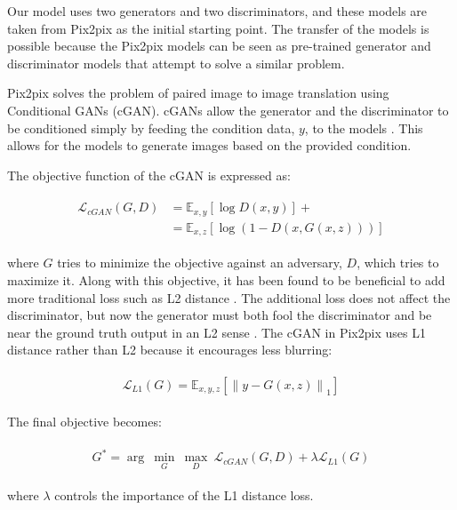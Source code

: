 \documentclass[conference]{IEEEtran}
\begin{document}
Our model uses two generators and two discriminators, and these models are taken from Pix2pix as the initial starting point. The transfer of the models is possible because the Pix2pix models can be seen as pre-trained generator and discriminator models that attempt to solve a similar problem. 

Pix2pix solves the problem of paired image to image translation using Conditional GANs (cGAN). cGANs allow the generator and the discriminator to be conditioned simply by feeding the condition data, $y$, to the models \cite{mirza_conditional_2014}. This allows for the models to generate images based on the provided condition.

The objective function of the cGAN is expressed as:

\begin{align}
    \begin{split}
        \mathcal{L}_{cGAN}(G,D) &= \mathbb{E}_{x,y}[\log D(x,y)] + \\
        &= \mathbb{E}_{x,z}[\log(1-D(x,G(x,z)))]
    \end{split}
\end{align}

where $G$ tries to minimize the objective against an adversary, $D$, which tries to maximize it. Along with this objective, it has been found to be beneficial to add more traditional loss such as L2 distance \cite{pathak_context_2016}. The additional loss does not affect the discriminator, but now the generator must both fool the discriminator and be near the ground truth output in an L2 sense \cite{isola_image--image_2018}. The cGAN in Pix2pix uses L1 distance rather than L2 because it encourages less blurring:

\begin{align}
    \begin{split}
        \mathcal{L}_{L1}(G)=\mathbb{E}_{x,y,z}[{\lVert y - G(x,z) \rVert}_1]
    \end{split}
\end{align}

The final objective becomes:

\begin{align}
    \begin{split}
        G^* = {\arg}\:\underset{G}{\min}\:\underset{D}{\max}\:\mathcal{L}_{cGAN}(G,D) + \lambda\mathcal{L}_{L1}(G)
    \end{split}
\end{align}

where $\lambda$ controls the importance of the L1 distance loss. 
\end{document}
